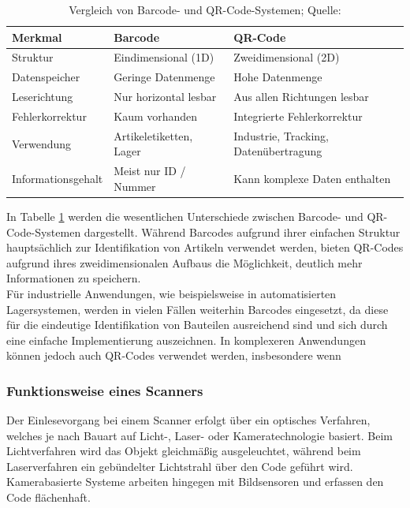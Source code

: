 \begin{table}[H]
	\centering
	\renewcommand{\arraystretch}{1.3}
	\begin{tabular}{|p{4cm}|p{4.5cm}|p{4.5cm}|}
		\hline
		\textbf{Merkmal} & \textbf{Barcode} & \textbf{QR-Code} \\ \hline
		Struktur & Eindimensional (1D) & Zweidimensional (2D) \\ \hline
		Datenspeicher & Geringe Datenmenge & Hohe Datenmenge \\ \hline
		Leserichtung & Nur horizontal lesbar & Aus allen Richtungen lesbar \\ \hline
		Fehlerkorrektur & Kaum vorhanden & Integrierte Fehlerkorrektur \\ \hline
		Verwendung & Artikeletiketten, Lager & Industrie, Tracking, Datenübertragung \\ \hline
		Informationsgehalt & Meist nur ID / Nummer & Kann komplexe Daten enthalten \\ \hline
	\end{tabular}
	\caption{Vergleich von Barcode- und QR-Code-Systemen; Quelle: \cite{Codes}}
	\label{tab:Codes}
\end{table}

In Tabelle \ref{tab:Codes} werden die wesentlichen Unterschiede zwischen Barcode- und QR-Code-Systemen dargestellt. Während Barcodes aufgrund ihrer einfachen Struktur hauptsächlich zur Identifikation von Artikeln verwendet werden, bieten QR-Codes aufgrund ihres zweidimensionalen Aufbaus die Möglichkeit, deutlich mehr Informationen zu speichern.\\

Für industrielle Anwendungen, wie beispielsweise in automatisierten Lagersystemen, werden in vielen Fällen weiterhin Barcodes eingesetzt, da diese für die eindeutige Identifikation von Bauteilen ausreichend sind und sich durch eine einfache Implementierung auszeichnen. In komplexeren Anwendungen können jedoch auch QR-Codes verwendet werden, insbesondere wenn \subsubsection{Funktionsweise eines Scanners}

Der Einlesevorgang bei einem Scanner erfolgt über ein optisches Verfahren, welches je nach Bauart auf Licht-, Laser- oder Kameratechnologie basiert. 
Beim Lichtverfahren wird das Objekt gleichmäßig ausgeleuchtet, während beim Laserverfahren ein gebündelter Lichtstrahl über den Code geführt wird. Kamerabasierte Systeme arbeiten hingegen mit Bildsensoren und erfassen den Code flächenhaft.\\

